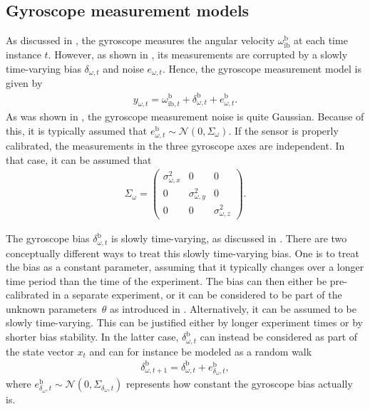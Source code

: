 \subsection{Gyroscope measurement models}
\label{sec:models-gyrMeasModel}
As discussed in , the gyroscope measures the angular velocity $\omega_{\text{ib}}^\text{b}$ at each time instance $t$. However, as shown in , its measurements are corrupted by a slowly time-varying bias $\delta_{\omega,t}$ and noise $e_{\omega,t}$. Hence, the gyroscope measurement model is given by
\begin{align}
\label{eq:models-gyrMeasModelGeneral}
y_{\omega,t} = \omega_{\text{ib},t}^\text{b} + \delta_{\omega,t}^\text{b} + e_{\omega,t}^\text{b}.
\end{align}
As was shown in , the gyroscope measurement noise is quite Gaussian. Because of this, it is typically assumed that $e_{\omega,t}^\text{b} \sim \mathcal{N}(0, \Sigma_\omega)$. If the sensor is properly calibrated, the measurements in the three gyroscope axes are independent. In that case, it can be assumed that
\begin{align}
\Sigma_\omega = \begin{pmatrix} \sigma_{\omega,x}^2 & 0 & 0 \\ 0 & \sigma_{\omega,y}^2 & 0 \\ 0 & 0 & \sigma_{\omega,z}^2 \end{pmatrix}.
\end{align}

The gyroscope bias $\delta_{\omega,t}^\text{b}$ is slowly time-varying, as discussed in . There are two conceptually different ways to treat this slowly time-varying bias. One is to treat the bias as a constant parameter, assuming that it typically changes over a longer time period than the time of the experiment. The bias can then either be pre-calibrated in a separate experiment, or it can be considered to be part of the unknown parameters~$\theta$ as introduced in . Alternatively, it can be assumed to be slowly time-varying. This can be justified either by longer experiment times or by shorter bias stability. In the latter case, $\delta_{\omega,t}^\text{b}$ can instead be considered as part of the state vector $x_t$ and can for instance be modeled as a random walk 
\begin{align}
\label{eq:models-gyrBiasRandomWalk}
\delta_{\omega,t+1}^\text{b} = \delta_{\omega,t}^\text{b} + e^\text{b}_{\delta_\omega,t},
\end{align}
where $e^\text{b}_{\delta_\omega,t} \sim \mathcal{N}(0, \Sigma_{\delta_{\omega},t})$ represents how constant the gyroscope bias actually is. 

